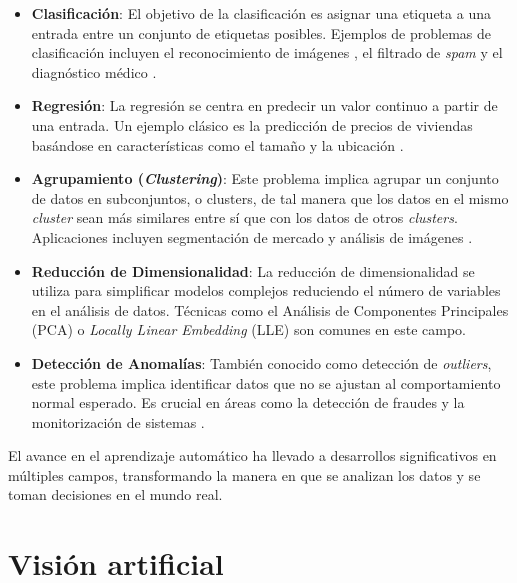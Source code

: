 \begin{itemize}
	\item \textbf{Clasificación}: El objetivo de la clasificación es asignar una etiqueta
	a una entrada entre un conjunto de etiquetas posibles. Ejemplos de problemas
	de clasificación incluyen el reconocimiento de imágenes \cite{Schroff_2015},
	el filtrado de \textit{spam} \cite{dada2019machine} y el diagnóstico médico
	\cite{singhal2022largelanguagemodelsencode}.
	
	\item \textbf{Regresión}: La regresión se centra en predecir un valor continuo
	a partir de una entrada. Un ejemplo clásico es la predicción de precios de
	viviendas basándose en características como el tamaño y la ubicación
	\cite{wang2021deep}.
	
	\item \textbf{Agrupamiento (\textit{Clustering})}: Este problema implica agrupar
	un conjunto de datos en subconjuntos, o clusters, de tal manera que los datos
	en el mismo \textit{cluster} sean más similares entre sí que con los datos
	de otros \textit{clusters}. Aplicaciones incluyen segmentación de mercado
	\cite{kim2006customer} y análisis de imágenes
	\cite{radford2016unsupervisedrepresentationlearningdeep}.
	
	\item \textbf{Reducción de Dimensionalidad}: La reducción de dimensionalidad se
	utiliza para simplificar modelos complejos reduciendo el número de variables
	en el análisis de datos. Técnicas como el Análisis de Componentes
	Principales (PCA) \cite{WOLD198737} o \textit{Locally Linear Embedding} (LLE)
	\cite{roweis2000nonlinear} son comunes en este campo.
	
	\item \textbf{Detección de Anomalías}: También conocido como detección de \textit{outliers},
	este problema implica identificar datos que no se ajustan al comportamiento normal
	esperado. Es crucial en áreas como la detección de fraudes
	\cite{phua2010comprehensive} y la monitorización de sistemas
	\cite{nashif2018heart}.
\end{itemize}

El avance en el aprendizaje automático ha llevado a desarrollos significativos en
múltiples campos, transformando la manera en que se analizan los datos y se
toman decisiones en el mundo real.

\section{Visión artificial}

